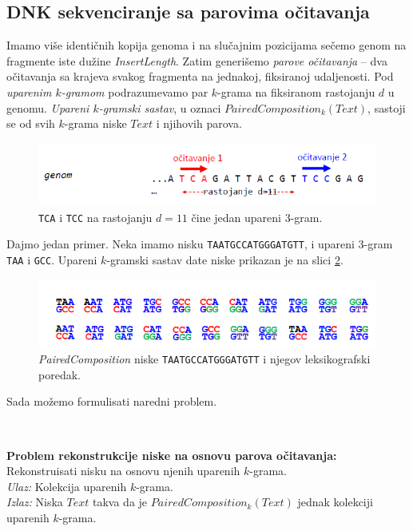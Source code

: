 \subsection{DNK sekvenciranje sa parovima očitavanja} 

Imamo više identičnih kopija genoma i na slučajnim pozicijama sečemo genom na fragmente iste dužine \textit{InsertLength}. Zatim generišemo \emph{parove očitavanja} -- dva očitavanja sa krajeva svakog fragmenta na jednakoj, fiksiranoj udaljenosti. Pod \emph{uparenim $k$-gramom} podrazumevamo par $k$-grama na fiksiranom rastojanju $d$ u genomu. \emph{Upareni $k$-gramski sastav}, u oznaci $PairedComposition_k(Text)$, sastoji se od svih $k$-grama niske $Text$ i njihovih parova.

\begin{figure}[h]
	\centering
	\includegraphics[width=1\textwidth]{poglavlja/3/slike/upareni_kgram.png}
	\caption{\texttt{TCA} i \texttt{TCC} na rastojanju $d=11$ čine jedan upareni 3-gram.}
	\label{slika:upareni}
\end{figure} 

Dajmo jedan primer. Neka imamo nisku \texttt{TAATGCCATGGGATGTT}, i upareni 3-gram \texttt{TAA} i \texttt{GCC}. Upareni $k$-gramski sastav date niske prikazan je na slici \ref{slika:upareni3}.

\begin{figure}[h]
	\centering
	\includegraphics[width=1\textwidth]{poglavlja/3/slike/upareni_3gram.png}
	\caption{\emph{PairedComposition} niske \texttt{TAATGCCATGGGATGTT} i njegov leksikografski poredak.}
	\label{slika:upareni3}
\end{figure} 

Sada mo\v zemo formulisati naredni problem.

~ \\
\begin{tcolorbox}
	\textbf{Problem rekonstrukcije niske na osnovu parova očitavanja:}	Rekonstruisati nisku na osnovu njenih uparenih $k$-grama. \\
	\textit{Ulaz:} Kolekcija uparenih $k$-grama.\\
	\textit{Izlaz:} Niska $Text$ takva da je $PairedComposition_k(Text)$ jednak kolekciji uparenih $k$-grama. 
\end{tcolorbox}
~\\

